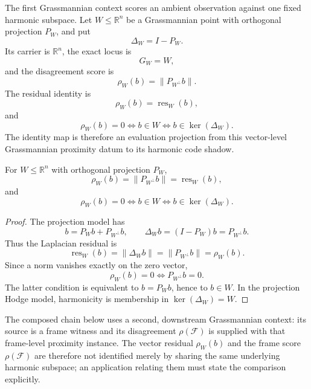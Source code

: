 The first Grassmannian context scores an ambient observation against one fixed
harmonic subspace. Let \(W\le \mathbb R^n\) be a Grassmannian point with
orthogonal projection \(P_W\), and put
\[
  \Delta_W=I-P_W.
\]
Its carrier is \(\mathbb R^n\), the exact locus is
\[
  G_W=W,
\]
and the disagreement score is
\[
  \rho_W(b)=\|P_{W^\perp}b\|.
\]
The residual identity is
\[
  \rho_W(b)=\operatorname{res}_W(b),
\]
and
\[
  \rho_W(b)=0
  \Longleftrightarrow
  b\in W
  \Longleftrightarrow
  b\in\ker(\Delta_W).
\]
The identity map is therefore an evaluation projection from this vector-level
Grassmannian proximity datum to its harmonic code shadow.

\begin{proposition}\label{prop:grassmannian-residual}
For \(W\le\mathbb R^n\) with orthogonal projection \(P_W\),
\[
  \rho_W(b)=\|P_{W^\perp}b\|
  =
  \operatorname{res}_W(b),
\]
and
\[
  \rho_W(b)=0
  \Longleftrightarrow b\in W
  \Longleftrightarrow b\in\ker(\Delta_W).
\]
\end{proposition}

\begin{proof}
The projection model has
\[
  b=P_Wb+P_{W^\perp}b,\qquad
  \Delta_W b=(I-P_W)b=P_{W^\perp}b.
\]
Thus the Laplacian residual is
\[
  \operatorname{res}_W(b)=\|\Delta_W b\|=\|P_{W^\perp}b\|=\rho_W(b).
\]
Since a norm vanishes exactly on the zero vector,
\[
  \rho_W(b)=0
  \Longleftrightarrow P_{W^\perp}b=0.
\]
The latter condition is equivalent to \(b=P_Wb\), hence to \(b\in W\). In the
projection Hodge model, harmonicity is membership in \(\ker(\Delta_W)=W\).
\end{proof}

The composed chain below uses a second, downstream Grassmannian context: its
source is a frame witness and its disagreement \(\rho(\mathcal F)\) is supplied
with that frame-level proximity instance. The vector residual \(\rho_W(b)\) and
the frame score \(\rho(\mathcal F)\) are therefore not identified merely by
sharing the same underlying harmonic subspace; an application relating them
must state the comparison explicitly.


